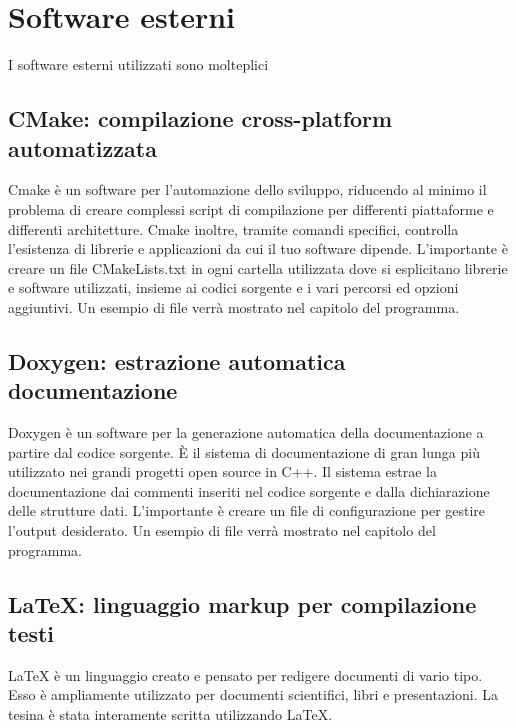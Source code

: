 \section{Software esterni}
I software esterni utilizzati sono molteplici
\subsection{CMake: compilazione cross-platform automatizzata}
Cmake è un software per l'automazione dello sviluppo, riducendo al minimo il problema di creare complessi script di compilazione per differenti piattaforme e differenti architetture. Cmake inoltre, tramite comandi specifici, controlla l'esistenza di librerie e applicazioni da cui il tuo software dipende. L'importante è creare un file CMakeLists.txt in ogni cartella utilizzata dove si esplicitano librerie e software utilizzati, insieme ai codici sorgente e i vari percorsi ed opzioni aggiuntivi. Un esempio di file verrà mostrato nel capitolo del programma.
\subsection{Doxygen: estrazione automatica documentazione}
Doxygen è un software per la generazione automatica della documentazione a partire dal codice sorgente.
È il sistema di documentazione di gran lunga più utilizzato nei grandi progetti open source in C++.
Il sistema estrae la documentazione dai commenti inseriti nel codice sorgente e dalla dichiarazione delle strutture dati.
L'importante è creare un file di configurazione per gestire l'output desiderato. Un esempio di file verrà mostrato nel capitolo del programma.
\subsection{\LaTeX{}: linguaggio markup per compilazione testi}
\LaTeX{} è un linguaggio creato e pensato per redigere documenti di vario tipo. Esso è ampliamente utilizzato per documenti scientifici, libri e presentazioni. La tesina è stata interamente scritta utilizzando \LaTeX{}.